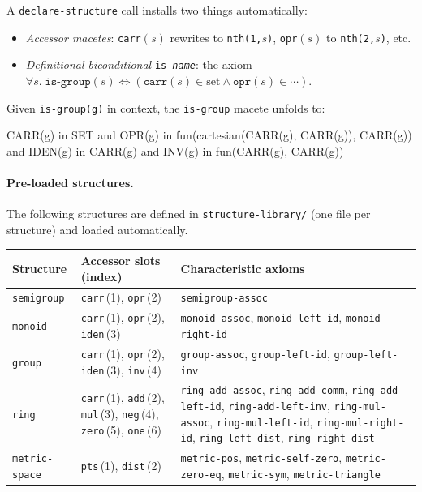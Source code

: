 A \texttt{declare-structure} call installs two things automatically:
\begin{itemize}
\item \emph{Accessor macetes}: \texttt{carr}$(s)$ rewrites to
  \texttt{nth(1,$s$)}, \texttt{opr}$(s)$ to \texttt{nth(2,$s$)}, etc.
\item \emph{Definitional biconditional} \texttt{is-\textit{name}}: the axiom
  $\forall s.\;\texttt{is-group}(s) \Leftrightarrow
   (\texttt{carr}(s)\in\mathrm{set} \wedge \texttt{opr}(s)\in\cdots)$.
\end{itemize}

Given \texttt{is-group(g)} in context, the \texttt{is-group} macete
unfolds to:
\begin{VNBsnip}
CARR(g) in SET
and OPR(g) in fun(cartesian(CARR(g), CARR(g)), CARR(g))
and IDEN(g) in CARR(g)
and INV(g) in fun(CARR(g), CARR(g))
\end{VNBsnip}

\paragraph{Pre-loaded structures.}
The following structures are defined in \texttt{structure-library/} (one
file per structure) and loaded automatically.

\begin{center}\scriptsize
\begin{tabular}{@{}p{2.3cm}p{4.3cm}p{5.3cm}@{}}
\toprule
\textbf{Structure} & \textbf{Accessor slots (index)} & \textbf{Characteristic axioms} \\
\midrule
\texttt{semigroup} &
  \texttt{carr}\,(1), \texttt{opr}\,(2) &
  \texttt{semigroup-assoc} \\[4pt]
\texttt{monoid} &
  \texttt{carr}\,(1), \texttt{opr}\,(2), \texttt{iden}\,(3) &
  \texttt{monoid-assoc},
  \texttt{monoid-left-id},
  \texttt{monoid-right-id} \\[4pt]
\texttt{group} &
  \texttt{carr}\,(1), \texttt{opr}\,(2), \texttt{iden}\,(3), \texttt{inv}\,(4) &
  \texttt{group-assoc},
  \texttt{group-left-id},
  \texttt{group-left-inv} \\[4pt]
\texttt{ring} &
  \texttt{carr}\,(1), \texttt{add}\,(2), \texttt{mul}\,(3),
  \texttt{neg}\,(4), \texttt{zero}\,(5), \texttt{one}\,(6) &
  \texttt{ring-add-assoc}, \texttt{ring-add-comm},
  \texttt{ring-add-left-id}, \texttt{ring-add-left-inv},
  \texttt{ring-mul-assoc}, \texttt{ring-mul-left-id},
  \texttt{ring-mul-right-id},
  \texttt{ring-left-dist}, \texttt{ring-right-dist} \\[4pt]
\texttt{metric-space} &
  \texttt{pts}\,(1), \texttt{dist}\,(2) &
  \texttt{metric-pos},
  \texttt{metric-self-zero},
  \texttt{metric-zero-eq},
  \texttt{metric-sym},
  \texttt{metric-triangle} \\
\bottomrule
\end{tabular}
\end{center}

